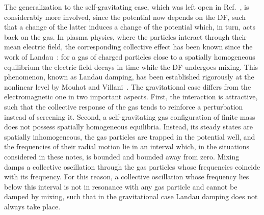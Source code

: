The generalization to the self-gravitating case, which was left open in Ref.~\cite{pRoS20}, is considerably more involved, since the potential now depends on the DF, such that a change of the latter induces a change of the potential which, in turn, acts back on the gas. In plasma physics, where the particles interact through their mean electric field, the corresponding collective effect has been known since the work of Landau~\cite{lL46}: for a gas of charged particles close to a spatially homogeneous equilibrium the electric field decays in time while the DF undergoes mixing. This phenomenon, known as Landau damping, has been established rigorously at the nonlinear level by Mouhot and Villani~\cite{cMcV11}. The gravitational case differs from the electromagnetic one in two important aspects. First, the interaction is attractive, such that the collective response of the gas tends to reinforce a perturbation instead of screening it. Second, a self-gravitating gas configuration of finite mass does not possess spatially homogeneous equilibria. Instead, its steady states are spatially inhomogeneous, the gas particles are trapped in the potential well, and the frequencies of their radial motion lie in an interval which, in the situations considered in these notes, is bounded and bounded away from zero. Mixing damps a collective oscillation through the gas particles whose frequencies coincide with its frequency. For this reason, a collective oscillation whose frequency lies below this interval is not in resonance with any gas particle and cannot be damped by mixing, such that in the gravitational case Landau damping does not always take place.

